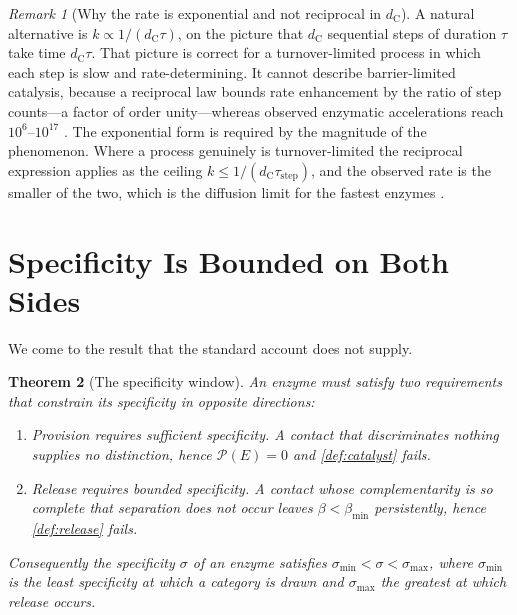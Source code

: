 \documentclass[11pt,twocolumn,a4paper]{article}
\theoremstyle{plain}
\newtheorem{theorem}{Theorem}[section]
\theoremstyle{definition}
\theoremstyle{remark}
\newtheorem{remark}[theorem]{Remark}
\newcommand{\thick}{\beta}
\newcommand{\floor}{\thick_{\min}}
\newcommand{\dC}{d_{\mathrm{C}}}
\newcommand{\Enz}{E}
\newcommand{\prov}{\mathcal{P}}
\begin{document}
\begin{remark}[Why the rate is exponential and not reciprocal in $\dC$]
\label{rem:not-reciprocal}
A natural alternative is $k \propto 1/(\dC \tau)$, on the picture that $\dC$
sequential steps of duration $\tau$ take time $\dC\tau$. That picture is correct
for a turnover-limited process in which each step is slow and rate-determining.
It cannot describe barrier-limited catalysis, because a reciprocal law bounds
rate enhancement by the ratio of step counts---a factor of order unity---whereas
observed enzymatic accelerations reach $10^{6}$--$10^{17}$
\citep{wolfenden2001,radzicka1995}. The exponential form is required by the
magnitude of the phenomenon. Where a process genuinely is turnover-limited the
reciprocal expression applies as the ceiling
$k \leq 1/(\dC\tau_{\mathrm{step}})$, and the observed rate is the smaller of
the two, which is the diffusion limit for the fastest enzymes
\citep{knowles1977,albery1976}.
\end{remark}

\section{Specificity Is Bounded on Both Sides}
\label{sec:specificity}

We come to the result that the standard account does not supply.

\begin{theorem}[The specificity window]
\label{thm:window}
An enzyme must satisfy two requirements that constrain its specificity in
opposite directions:
\begin{enumerate}[label=(\roman*),leftmargin=2.5em]
\item \emph{Provision} requires sufficient specificity. A contact that
discriminates nothing supplies no distinction, hence
$\prov(\Enz) = 0$ and \cref{def:catalyst} fails.
\item \emph{Release} requires bounded specificity. A contact whose complementarity
is so complete that separation does not occur leaves $\thick < \floor$
persistently, hence \cref{def:release} fails.
\end{enumerate}
Consequently the specificity $\sigma$ of an enzyme satisfies
$\sigma_{\min} < \sigma < \sigma_{\max}$, where $\sigma_{\min}$ is the least
specificity at which a category is drawn and $\sigma_{\max}$ the greatest at
which release occurs.
\end{theorem}
\end{document}
